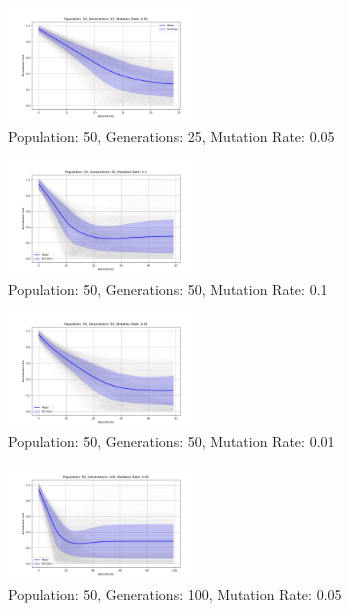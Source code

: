 \documentclass[
]{article}
\begin{document}
    \begin{figure}[H]
        \centering
        \includegraphics[width=0.45\textwidth]{genetic_algorithm/appendix/Population_50_Generations_25_MutationRate_0.05}
        \caption{Population: 50, Generations: 25, Mutation Rate: 0.05}
        \label{fig:app_ga_50_25_05}
    \end{figure}

    \begin{figure}[H]
        \centering
        \includegraphics[width=0.45\textwidth]{genetic_algorithm/appendix/Population_50_Generations_50_MutationRate_0.1}
        \caption{Population: 50, Generations: 50, Mutation Rate: 0.1}
        \label{fig:app_ga_50_50_1}
    \end{figure}

    \begin{figure}[H]
        \centering
        \includegraphics[width=0.45\textwidth]{genetic_algorithm/appendix/Population_50_Generations_50_MutationRate_0.01}
        \caption{Population: 50, Generations: 50, Mutation Rate: 0.01}
        \label{fig:app_ga_50_50_01}
    \end{figure}


    \begin{figure}[H]
        \centering
        \includegraphics[width=0.45\textwidth]{genetic_algorithm/appendix/Population_50_Generations_100_MutationRate_0.05}
        \caption{Population: 50, Generations: 100, Mutation Rate: 0.05}
        \label{fig:app_ga_50_100_05}
    \end{figure}
\end{document}
